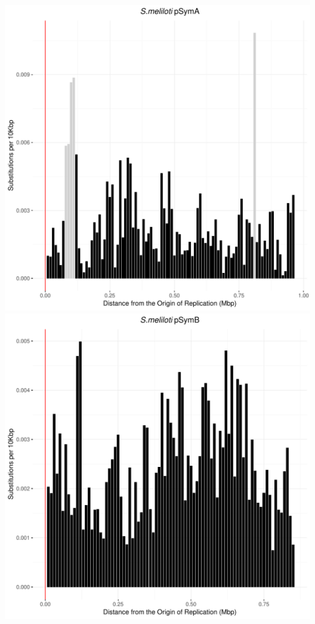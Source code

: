 \documentclass[12pt]{article}
\begin{document}
\includegraphics[width=\textwidth]{pSymA_weighted_subs_bidirectionality_colour_6Nov19.pdf}
\includegraphics[width=\textwidth]{pSymB_weighted_subs_bidirectionality_colour_6Nov19.pdf}
\end{document}
